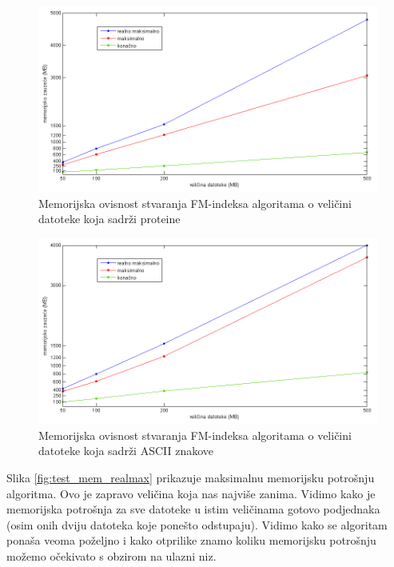 \begin{figure}[H]
   \centering
       \includegraphics[width=\textwidth]{./pictures/test_mem_proteini.png}
 \caption{Memorijska ovisnost stvaranja FM-indeksa algoritama o veličini datoteke koja sadrži proteine}
 \label{fig:test_mem_proteini}
\end{figure}

\begin{figure}[H]
   \centering
       \includegraphics[width=\textwidth]{./pictures/test_mem_ascii.png}
 \caption{Memorijska ovisnost stvaranja FM-indeksa algoritama o veličini datoteke koja sadrži ASCII znakove}
 \label{fig:test_mem_ascii}
\end{figure}

Slika  \ref{fig:test_mem_realmax} prikazuje maksimalnu memorijsku potrošnju algoritma. Ovo je zapravo veličina koja nas najviše zanima. Vidimo kako je memorijska potrošnja za sve datoteke u istim veličinama gotovo podjednaka (osim onih dviju datoteka koje ponešto odstupaju). Vidimo kako se algoritam ponaša veoma poželjno i kako otprilike znamo koliku memorijsku potrošnju možemo očekivato s obzirom na ulazni niz.


